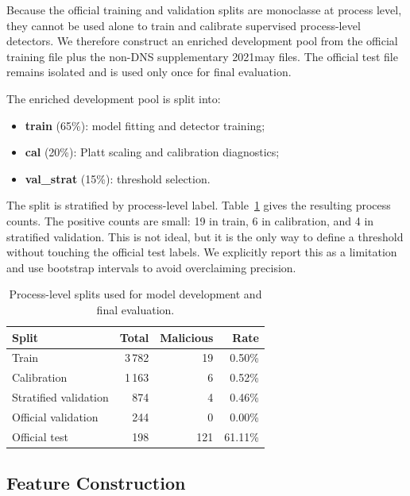 \documentclass[journal]{IEEEtran}
\begin{document}
Because the official training and validation splits are monoclasse at process level, they cannot be used alone to train and calibrate supervised process-level detectors. We therefore construct an enriched development pool from the official training file plus the non-DNS supplementary 2021may files. The official test file remains isolated and is used only once for final evaluation.

The enriched development pool is split into:
\begin{itemize}
    \item \textbf{train} (65\%): model fitting and detector training;
    \item \textbf{cal} (20\%): Platt scaling and calibration diagnostics;
    \item \textbf{val\_strat} (15\%): threshold selection.
\end{itemize}
The split is stratified by process-level label. Table~\ref{tab:splits_new} gives the resulting process counts. The positive counts are small: 19 in train, 6 in calibration, and 4 in stratified validation. This is not ideal, but it is the only way to define a threshold without touching the official test labels. We explicitly report this as a limitation and use bootstrap intervals to avoid overclaiming precision.

\begin{table}[t]
\centering
\caption{Process-level splits used for model development and final evaluation.}
\label{tab:splits_new}
\begin{tabular}{lrrr}
\toprule
\textbf{Split} & \textbf{Total} & \textbf{Malicious} & \textbf{Rate} \\
\midrule
Train & 3\,782 & 19 & 0.50\% \\
Calibration & 1\,163 & 6 & 0.52\% \\
Stratified validation & 874 & 4 & 0.46\% \\
Official validation & 244 & 0 & 0.00\% \\
Official test & 198 & 121 & 61.11\% \\
\bottomrule
\end{tabular}
\end{table}

\subsection{Feature Construction}
\end{document}
